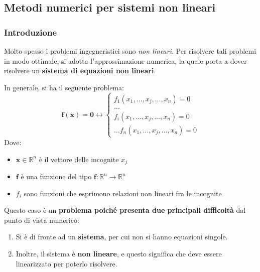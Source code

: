 \subsection{Metodi numerici per sistemi non lineari}

\subsubsection{Introduzione}

Molto spesso i problemi ingegneristici sono \emph{non lineari}. Per risolvere tali problemi in modo ottimale, si adotta l'approssimazione numerica, la quale porta a dover risolvere un \textbf{sistema di equazioni non lineari}.

\highspace
In generale, si ha il seguente problema:
\begin{equation*}
	\mathbf{f}\left(\mathbf{x}\right) = \mathbf{0} \longleftrightarrow \begin{cases}
		f_{1}\left(x_{1}, \dots, x_{j}, \dots, x_{n}\right) = 0 \\
		\dots \\
		f_{i}\left(x_{1}, \dots, x_{j}, \dots, x_{n}\right) = 0 \\
		\dots
		f_{n}\left(x_{1}, \dots, x_{j}, \dots, x_{n}\right) = 0
	\end{cases}
\end{equation*}
Dove:
\begin{itemize}
	\item $\mathbf{x} \in \mathbb{R}^{n}$ è il vettore delle incognite $x_{j}$
	
	\item $\mathbf{f}$ è una funzione del tipo $\mathbf{f}: \mathbb{R}^{n} \rightarrow \mathbb{R}^{n}$
	
	\item $f_{i}$ sono funzioni che esprimono relazioni non lineari fra le incognite
\end{itemize}
Questo caso è un \textbf{problema poiché presenta due principali difficoltà} dal punto di vista numerico:
\begin{enumerate}
	\item Si è di fronte ad un \textbf{sistema}, per cui non si hanno equazioni singole.
	
	\item Inoltre, il sistema è \textbf{non lineare}, e questo significa che deve essere linearizzato per poterlo risolvere.
\end{enumerate}

\newpage

